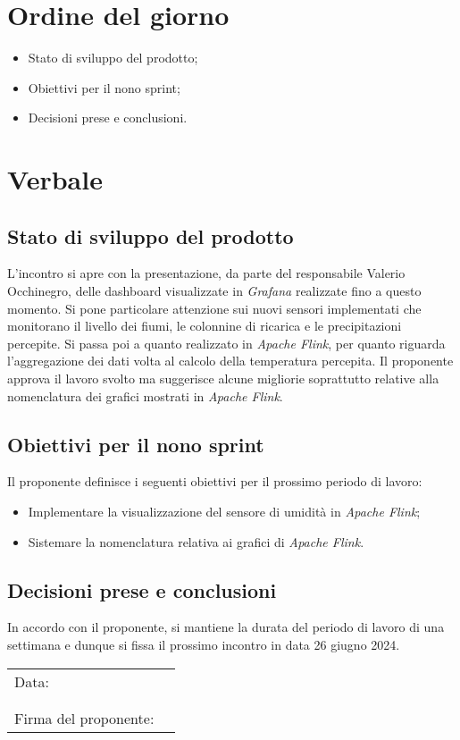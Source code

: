 \documentclass[italian,12pt]{article}
\begin{document}
\section{Ordine del giorno}
\begin{itemize}
	\item Stato di sviluppo del prodotto;
	\item Obiettivi per il nono sprint;
	\item Decisioni prese e conclusioni.
\end{itemize}

\newpage

\section{Verbale}

\subsection{Stato di sviluppo del prodotto}
L'incontro si apre con la presentazione, da parte del responsabile Valerio Occhinegro, delle dashboard visualizzate in \textit{Grafana} realizzate fino a questo momento.
Si pone particolare attenzione sui nuovi sensori implementati che monitorano il livello dei fiumi, le colonnine di ricarica e le precipitazioni percepite.
Si passa poi a quanto realizzato in \textit{Apache Flink}, per quanto riguarda l'aggregazione dei dati volta al calcolo della temperatura percepita.
Il proponente approva il lavoro svolto ma suggerisce alcune migliorie soprattutto relative alla nomenclatura dei grafici mostrati in \textit{Apache Flink}.

\subsection{Obiettivi per il nono sprint}
Il proponente definisce i seguenti obiettivi per il prossimo periodo di lavoro:
\begin{itemize}
	\item Implementare la visualizzazione del sensore di umidità in \textit{Apache Flink};
	\item Sistemare la nomenclatura relativa ai grafici di \textit{Apache Flink}.
\end{itemize}

\subsection{Decisioni prese e conclusioni}
In accordo con il proponente, si mantiene la durata del periodo di lavoro di una settimana e dunque si fissa il prossimo incontro in data
26 giugno 2024.

\begin{table}[b]
	\begin{tabular}{@{}p{5cm}p{10cm}@{}}
		Data:                 & \hrulefill \\
		                      &            \\
		                      &            \\
		Firma del proponente: & \hrulefill \\
	\end{tabular}
\end{table}
\end{document}
